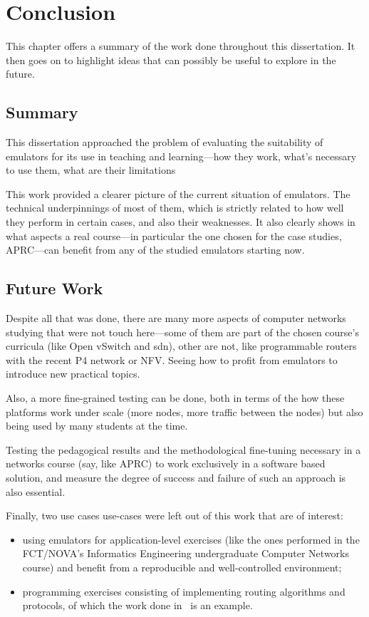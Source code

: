 
\chapter{Conclusion}
\label{ch:conclusion}

This chapter offers a summary of the work done throughout this dissertation.
It then goes on to highlight ideas that can possibly be useful to explore in the future.

\section{Summary}

This dissertation approached the problem of evaluating the suitability of emulators for its use in teaching and learning---how they work, what's necessary to use them, what are their limitations\textellipsis

This work provided a clearer picture of the current situation of emulators.
The technical underpinnings of most of them, which is strictly related to how well they perform in certain cases, and also their weaknesses.
It also clearly shows in what aspects a real course---in particular the one chosen for the case studies, APRC---can benefit from any of the studied emulators starting now.

\section{Future Work}

Despite all that was done, there are many more aspects of computer networks studying that were not touch here---some of them are part of the chosen course's curricula (like Open vSwitch and \gls{sdn}), other are not, like programmable routers with the recent P4 network or NFV.
Seeing how to profit from emulators to introduce new practical topics.

Also, a more fine-grained testing can be done, both in terms of the how these platforms work under scale (more nodes, more traffic between the nodes) but also being used by many students at the time.

Testing the pedagogical results and the methodological fine-tuning necessary in a networks course (say, like APRC) to work exclusively in a software based solution, and measure the degree of success and failure of such an approach is also essential.

Finally, two use cases use-cases were left out of this work that are of interest:
\begin{itemize}
  \item using emulators for application-level exercises (like the ones performed in the FCT/NOVA's Informatics Engineering undergraduate Computer Networks course) and benefit from a reproducible and well-controlled environment;
  \item programming exercises consisting of implementing routing algorithms and protocols, of which the work done in~\cite{teachandlearnmininet} is an example.
\end{itemize}


